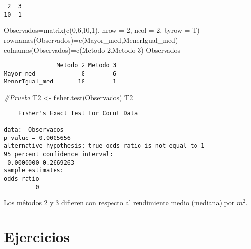 \documentclass[
  a4paper,
  oneside,
  openany]{book}
\newenvironment{Shaded}{\begin{snugshade}}{\end{snugshade}}
\newcommand{\AttributeTok}[1]{\textcolor[rgb]{0.77,0.63,0.00}{#1}}
\newcommand{\CommentTok}[1]{\textcolor[rgb]{0.56,0.35,0.01}{\textit{#1}}}
\newcommand{\DecValTok}[1]{\textcolor[rgb]{0.00,0.00,0.81}{#1}}
\newcommand{\FunctionTok}[1]{\textcolor[rgb]{0.00,0.00,0.00}{#1}}
\newcommand{\NormalTok}[1]{#1}
\newcommand{\OtherTok}[1]{\textcolor[rgb]{0.56,0.35,0.01}{#1}}
\newcommand{\StringTok}[1]{\textcolor[rgb]{0.31,0.60,0.02}{#1}}
\begin{document}
\begin{verbatim}
 2  3 
10  1 
\end{verbatim}

\begin{Shaded}
\begin{Highlighting}[]
\NormalTok{Observados}\OtherTok{=}\FunctionTok{matrix}\NormalTok{(}\FunctionTok{c}\NormalTok{(}\DecValTok{0}\NormalTok{,}\DecValTok{6}\NormalTok{,}\DecValTok{10}\NormalTok{,}\DecValTok{1}\NormalTok{), }\AttributeTok{nrow =} \DecValTok{2}\NormalTok{, }\AttributeTok{ncol =} \DecValTok{2}\NormalTok{, }\AttributeTok{byrow =}\NormalTok{ T)}
\FunctionTok{rownames}\NormalTok{(Observados)}\OtherTok{=}\FunctionTok{c}\NormalTok{(}\StringTok{\textquotesingle{}Mayor\_med\textquotesingle{}}\NormalTok{,}\StringTok{\textquotesingle{}MenorIgual\_med\textquotesingle{}}\NormalTok{)}
\FunctionTok{colnames}\NormalTok{(Observados)}\OtherTok{=}\FunctionTok{c}\NormalTok{(}\StringTok{\textquotesingle{}Metodo 2\textquotesingle{}}\NormalTok{,}\StringTok{\textquotesingle{}Metodo 3\textquotesingle{}}\NormalTok{)}
\NormalTok{Observados}
\end{Highlighting}
\end{Shaded}

\begin{verbatim}
               Metodo 2 Metodo 3
Mayor_med             0        6
MenorIgual_med       10        1
\end{verbatim}

\begin{Shaded}
\begin{Highlighting}[]
\CommentTok{\#Prueba}
\NormalTok{T2 }\OtherTok{\textless{}{-}} \FunctionTok{fisher.test}\NormalTok{(Observados)}
\NormalTok{T2}
\end{Highlighting}
\end{Shaded}

\begin{verbatim}
    Fisher's Exact Test for Count Data

data:  Observados
p-value = 0.0005656
alternative hypothesis: true odds ratio is not equal to 1
95 percent confidence interval:
 0.0000000 0.2669263
sample estimates:
odds ratio 
         0 
\end{verbatim}

Los métodos 2 y 3 difieren con respecto al rendimiento medio (mediana) por \(m^2\).

\hypertarget{ejercicios-2}{%
\chapter{Ejercicios}\label{ejercicios-2}}
\end{document}
